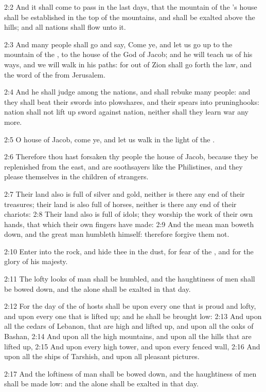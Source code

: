 2:2 And it shall come to pass in the last days, that the mountain of the \LORD's house shall be established in the top of the mountains, and shall be exalted above the hills; and all nations shall flow unto it.

2:3 And many people shall go and say, Come ye, and let us go up to the mountain of the \LORD, to the house of the God of Jacob; and he will teach us of his ways, and we will walk in his paths: for out of Zion shall go forth the law, and the word of the \LORD from Jerusalem.

2:4 And he shall judge among the nations, and shall rebuke many people: and they shall beat their swords into plowshares, and their spears into pruninghooks: nation shall not lift up sword against nation, neither shall they learn war any more.

2:5 O house of Jacob, come ye, and let us walk in the light of the \LORD.

2:6 Therefore thou hast forsaken thy people the house of Jacob, because they be replenished from the east, and are soothsayers like the Philistines, and they please themselves in the children of strangers.

2:7 Their land also is full of silver and gold, neither is there any end of their treasures; their land is also full of horses, neither is there any end of their chariots: 2:8 Their land also is full of idols; they worship the work of their own hands, that which their own fingers have made: 2:9 And the mean man boweth down, and the great man humbleth himself: therefore forgive them not.

2:10 Enter into the rock, and hide thee in the dust, for fear of the \LORD, and for the glory of his majesty.

2:11 The lofty looks of man shall be humbled, and the haughtiness of men shall be bowed down, and the \LORD alone shall be exalted in that day.

2:12 For the day of the \LORD of hosts shall be upon every one that is proud and lofty, and upon every one that is lifted up; and he shall be brought low: 2:13 And upon all the cedars of Lebanon, that are high and lifted up, and upon all the oaks of Bashan, 2:14 And upon all the high mountains, and upon all the hills that are lifted up, 2:15 And upon every high tower, and upon every fenced wall, 2:16 And upon all the ships of Tarshish, and upon all pleasant pictures.

2:17 And the loftiness of man shall be bowed down, and the haughtiness of men shall be made low: and the \LORD alone shall be exalted in that day.

